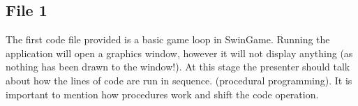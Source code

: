 \documentclass[12pt]{article}
\begin{document}
\subsection*{File 1}
The first code file provided is a basic game loop in SwinGame. Running the application will open a graphics window, however it will not display anything (as nothing has been drawn to the window!).
At this stage the presenter should talk about how the lines of code are run in sequence. (procedural programming). It is important to mention how procedures work
and shift the code operation.

\newpage
\end{document}
